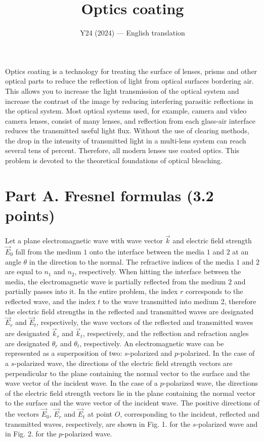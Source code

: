 \documentclass[11pt,a4paper]{article}
\title{\textbf{Optics coating}}
\author{\normalsize Y24 (2024) --- English translation}
\date{}
\begin{document}
\maketitle

Optics coating is a technology for treating the surface of lenses, prisms and other optical parts to reduce the reflection of light from optical surfaces bordering air. This allows you to increase the light transmission of the optical system and increase the contrast of the image by reducing interfering parasitic reflections in the optical system. Most optical systems used, for example, camera and video camera lenses, consist of many lenses, and reflection from each glass-air interface reduces the transmitted useful light flux. Without the use of clearing methods, the drop in the intensity of transmitted light in a multi-lens system can reach several tens of percent. Therefore, all modern lenses use coated optics. This problem is devoted to the theoretical foundations of optical bleaching.

\section*{Part A. Fresnel formulas (3.2 points)}

Let a plane electromagnetic wave with wave vector $\vec{k}$ and electric field strength $\vec{E}_0$ fall from the medium $1$ onto the interface between the media $1$ and $2$ at an angle $\theta$ in the direction to the normal. The refractive indices of the media $1$ and $2$ are equal to $n_1$ and $n_2$, respectively. When hitting the interface between the media, the electromagnetic wave is partially reflected from the medium $2$ and partially passes into it. In the entire problem, the index $r$ corresponds to the reflected wave, and the index $t$ to the wave transmitted into medium 2, therefore the electric field strengths in the reflected and transmitted waves are designated $\vec{E}_r$ and $\vec{E}_t$, respectively, the wave vectors of the reflected and transmitted waves are designated $\vec{k}_r$ and $\vec{k}_t$, respectively, and the reflection and refraction angles are designated $\theta_r$ and $\theta_t$, respectively. An electromagnetic wave can be represented as a superposition of two: $s$-polarized and $p$-polarized. In the case of a $s$-polarized wave, the directions of the electric field strength vectors are perpendicular to the plane containing the normal vector to the surface and the wave vector of the incident wave. In the case of a $p$-polarized wave, the directions of the electric field strength vectors lie in the plane containing the normal vector to the surface and the wave vector of the incident wave. The positive directions of the vectors $\vec{E}_0$, $\vec{E}_r$ and $\vec{E}_t$ at point $O$, corresponding to the incident, reflected and transmitted waves, respectively, are shown in Fig. 1. for the $s$-polarized wave and in Fig. 2. for the $p$-polarized wave.
\end{document}
